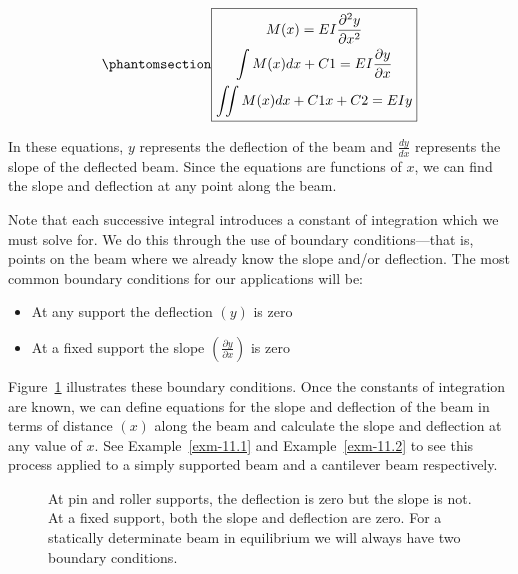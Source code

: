 \documentclass[
  letterpaper,
  DIV=11,
  numbers=noendperiod]{scrreprt}
\theoremstyle{definition}
\theoremstyle{remark}
\begin{document}
\begin{equation}\phantomsection\label{eq-11.1}{
\boxed{\begin{gathered}
M(x)=E I \frac{\partial^{2} y}{\partial x^{2}} \\
\int M(x) d x+C 1=E I \frac{\partial y}{\partial x} \\
\iint M(x) d x+C 1 x+C 2=E I y
\end{gathered}}
}\end{equation}

In these equations, \(y\) represents the deflection of the beam and
\(\frac{d y}{d x}\) represents the slope of the deflected beam. Since
the equations are functions of \(x\), we can find the slope and
deflection at any point along the beam.

Note that each successive integral introduces a constant of integration
which we must solve for. We do this through the use of boundary
conditions---that is, points on the beam where we already know the slope
and/or deflection. The most common boundary conditions for our
applications will be:

\begin{itemize}
\item
  At any support the deflection \((y)\) is zero
\item
  At a fixed support the slope
  \(\left(\frac{\partial y}{\partial x}\right)\) is zero
\end{itemize}

Figure~\ref{fig-11.3} illustrates these boundary conditions. Once the
constants of integration are known, we can define equations for the
slope and deflection of the beam in terms of distance \((x)\) along the
beam and calculate the slope and deflection at any value of \(x\). See
Example~\ref{exm-11.1} and Example~\ref{exm-11.2} to see this process
applied to a simply supported beam and a cantilever beam respectively.

\begin{figure}


\caption{\label{fig-11.3}At pin and roller supports, the deflection is
zero but the slope is not. At a fixed support, both the slope and
deflection are zero. For a statically determinate beam in equilibrium we
will always have two boundary conditions.}

\end{figure}%
\end{document}
